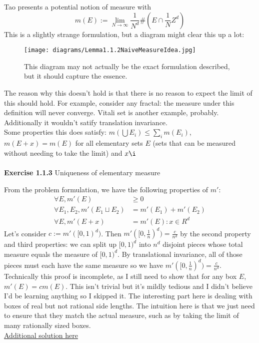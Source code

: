 \documentclass[answers,12pt]{exam}
\begin{document}
Tao presents a potential notion of measure with 
\begin{equation}
m(E) := \lim_{N \rightarrow \infty}\frac{1}{N^d}\#(E\cap \frac{1}{N}Z^d)    
\end{equation}
This is a slightly strange formulation, but a diagram might clear this up a lot:
\begin{figure}[H]
    \centering
    \texttt{[image: diagrams/Lemma1.1.2NaiveMeasureIdea.jpg]}
    \caption{This diagram may not actually be the exact formulation described, but it should capture the essence.}
    \label{fig:my_label}
\end{figure}

The reason why this doesn't hold is that there is no reason to expect the limit of this should hold.
For example, consider any fractal: the measure under this definition will never converge. 
Vitali set is another example, probably.
Additionally it wouldn't satify translation invariance.\\
Some properties this does satisfy: $m(\bigcup E_i) \leq \sum_i m(E_i)$, $m(E+x) = m(E)$ for all elementary sets $E$ (sets that can be measured without needing to take the limit) and $x\i$\\ \\
\textbf{Exercise 1.1.3} Uniqueness of elementary measure
\begin{solution}
    From the problem formulation, we have the following properties of $m'$: 
    \[
        \begin{aligned}
        \forall E, m'(E) &\geq 0\\
        \forall E_1, E_2, m'(E_1\sqcup E_2) &= m'(E_1)+m'(E_2)\\
        \forall E, m'(E+x) &= m'(E): x \in R^d
        \end{aligned}
    \]
    Let's consider $c:=m'([0,1)^d)$. 
    Then $m'([0,\frac{1}{n})^d) = \frac{c}{n^d}$ by the second property and third properties: 
    we can split up $[0,1)^d$ into $n^d$ disjoint pieces whose total measure equals the measure of $[0,1)^d$.
    By translational invariance, all of those pieces must each have the same measure so we have $m'([0,\frac{1}{n})^d) = \frac{c}{n^d}$.\\
    Technically this proof is incomplete, as I still need to show that for any box $E$, $m'(E) = cm(E)$.
    This isn't trivial but it's mildly tedious and I didn't believe I'd be learning anything so I skipped it. 
    The interesting part here is dealing with boxes of real but not rational side lengths. 
    The intuition here is that we just need to ensure that they match the actual measure, such as by taking the limit of many rationally sized boxes.\\
    \href{https://math.solverer.com/library/terence_tao/an_introduction_to_measure_theory/exercise_1-1-3}{Additional solution here}
\end{solution}
\end{document}

